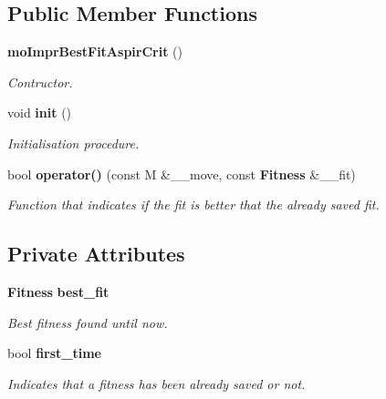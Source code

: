 \subsection*{Public Member Functions}
\begin{CompactItemize}
\item 
{\bf mo\-Impr\-Best\-Fit\-Aspir\-Crit} ()\label{classmo_impr_best_fit_aspir_crit_e2c697a5cf3a7696e38bb52b6694a340}

\begin{CompactList}\small\item\em Contructor. \item\end{CompactList}\item 
void {\bf init} ()\label{classmo_impr_best_fit_aspir_crit_ffa451a14ff4ea86fb8bd9fdbc348630}

\begin{CompactList}\small\item\em Initialisation procedure. \item\end{CompactList}\item 
bool {\bf operator()} (const M \&\_\-\_\-move, const {\bf Fitness} \&\_\-\_\-fit)
\begin{CompactList}\small\item\em Function that indicates if the fit is better that the already saved fit. \item\end{CompactList}\end{CompactItemize}
\subsection*{Private Attributes}
\begin{CompactItemize}
\item 
{\bf Fitness} {\bf best\_\-fit}\label{classmo_impr_best_fit_aspir_crit_9e52383f0af8013b4aff0942325e1bf3}

\begin{CompactList}\small\item\em Best fitness found until now. \item\end{CompactList}\item 
bool {\bf first\_\-time}\label{classmo_impr_best_fit_aspir_crit_2d5226c7dd661b33011402dbbbe78265}

\begin{CompactList}\small\item\em Indicates that a fitness has been already saved or not. \item\end{CompactList}\end{CompactItemize}


